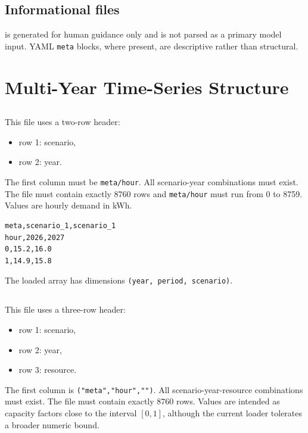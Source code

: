 \documentclass[11pt,a4paper]{report}
\newcommand{\code}[1]{\texttt{#1}}
\begin{document}
\section{Informational files}

 is generated for human guidance only and is not parsed as a primary model input. YAML \code{meta} blocks, where present, are descriptive rather than structural.

\chapter{Multi-Year Time-Series Structure}\label{sec:multi-year-ts}

\section{}

This file uses a two-row header:

\begin{itemize}[leftmargin=1.5em]
  \item row 1: scenario,
  \item row 2: year.
\end{itemize}

The first column must be \code{meta/hour}. All scenario-year combinations must exist. The file must contain exactly 8760 rows and \code{meta/hour} must run from 0 to 8759. Values are hourly demand in kWh.

\begin{lstlisting}[style=mgpy]
meta,scenario_1,scenario_1
hour,2026,2027
0,15.2,16.0
1,14.9,15.8
\end{lstlisting}

The loaded array has dimensions \code{(year, period, scenario)}.

\section{}

This file uses a three-row header:

\begin{itemize}[leftmargin=1.5em]
  \item row 1: scenario,
  \item row 2: year,
  \item row 3: resource.
\end{itemize}

The first column is \code{("meta","hour","")}. All scenario-year-resource combinations must exist. The file must contain exactly 8760 rows. Values are intended as capacity factors close to the interval $[0,1]$, although the current loader tolerates a broader numeric bound.
\end{document}
